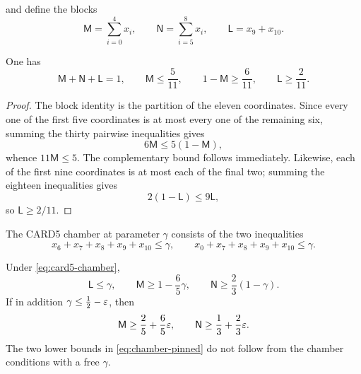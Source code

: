 and define the blocks
\begin{equation}\label{eq:blocks}
 \mathsf M=\sum_{i=0}^{4}x_i,
 \qquad
 \mathsf N=\sum_{i=5}^{8}x_i,
 \qquad
 \mathsf L=x_9+x_{10}.
\end{equation}

\begin{proposition}\label{prop:611}
One has
\begin{equation}\label{eq:611-ledger}
 \mathsf M+\mathsf N+\mathsf L=1,
 \qquad \mathsf M\le\frac5{11},
 \qquad 1-\mathsf M\ge\frac6{11},
 \qquad \mathsf L\ge\frac2{11}.
\end{equation}
\end{proposition}

\begin{proof}
The block identity is the partition of the eleven coordinates.  Since every
one of the first five coordinates is at most every one of the remaining six,
summing the thirty pairwise inequalities gives
\[
            6\mathsf M\le5(1-\mathsf M),
\]
whence $11\mathsf M\le5$.  The complementary bound follows immediately.
Likewise, each of the first nine coordinates is at most each of the final two;
summing the eighteen inequalities gives
\[
            2(1-\mathsf L)\le9\mathsf L,
\]
so $\mathsf L\ge2/11$.
\end{proof}

The CARD5 chamber at parameter $\gamma$ consists of the two inequalities
\begin{equation}\label{eq:card5-chamber}
 x_6+x_7+x_8+x_9+x_{10}\le\gamma,
 \qquad
 x_0+x_7+x_8+x_9+x_{10}\le\gamma.
\end{equation}

\begin{proposition}\label{prop:chamber}
Under \cref{eq:card5-chamber},
\begin{equation}\label{eq:chamber-unpinned}
 \mathsf L\le\gamma,
 \qquad
 \mathsf M\ge1-\frac65\gamma,
 \qquad
 \mathsf N\ge\frac23(1-\gamma).
\end{equation}
If in addition $\gamma\le\frac12-\varepsilon$, then
\begin{equation}\label{eq:chamber-pinned}
 \mathsf M\ge\frac25+\frac65\varepsilon,
 \qquad
 \mathsf N\ge\frac13+\frac23\varepsilon.
\end{equation}
The two lower bounds in \cref{eq:chamber-pinned} do not follow from the chamber
conditions with a free $\gamma$.
\end{proposition}

